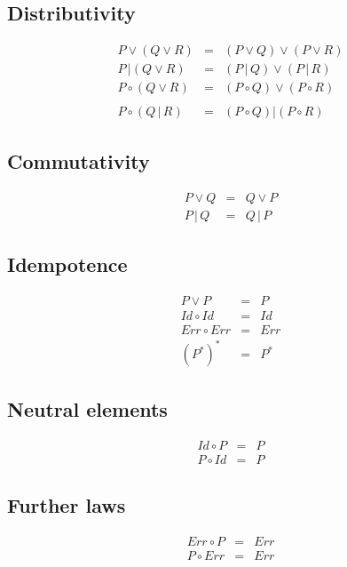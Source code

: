 \subsection{Distributivity}
\begin{eqnarray*}
  P \vee \left( Q \vee R \right) & = & \left( P \vee Q \right) \vee \left( P \vee R \right) \\
  P \,| \left( Q \vee R \right) & = & \left( P \,|\, Q \right) \vee \left( P \,|\, R \right) \\
  P \circ \left( Q \vee R \right) & = & \left( P \circ Q \right) \vee \left( P \circ R \right) \\
  & & \\
  P \circ \left( Q \,|\, R \right) & = & \left( P \circ Q \right) | \left( P \circ R \right)
\end{eqnarray*}

\subsection{Commutativity}
\begin{eqnarray*}
  P \vee Q & = & Q \vee P \\
  P \,|\, Q & = & Q \,|\, P
\end{eqnarray*}

\subsection{Idempotence}
\begin{eqnarray*}
  P \vee P & = & P \\
  Id \circ Id & = & Id \\
  Err \circ Err & = & Err \\
  (P^*)^* & = & P^*
\end{eqnarray*}

\subsection{Neutral elements}
\begin{eqnarray*}
  Id \circ P & = & P \\
  P \circ Id & = & P
\end{eqnarray*}

\subsection{Further laws}
\begin{eqnarray*}
  Err \circ P & = & Err \\
  P \circ Err & = & Err
\end{eqnarray*}

